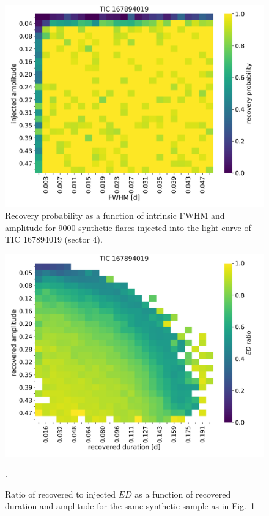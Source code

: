 \documentclass[twocolumn]{aastex62}
\begin{document}
\begin{figure}
	\includegraphics[width=\columnwidth]{figures/heatmap_recprob_TIC167894019_s0004.png}
    \caption{Recovery probability as a function of intrinsic FWHM and amplitude for 9000 synthetic flares injected into the light curve of TIC 167894019 (sector 4).}
    \label{fig:injrec_recprob}
\end{figure}

\begin{figure}
	\includegraphics[width=\columnwidth]{figures/heatmap_edrec_TIC167894019_s0004.png}
    \caption{Ratio of recovered to injected $ED$ as a function of recovered duration and amplitude for the same synthetic sample as in Fig.~\ref{fig:injrec_recprob}}.
    \label{fig:injrec_edrec}
\end{figure}
\end{document}

